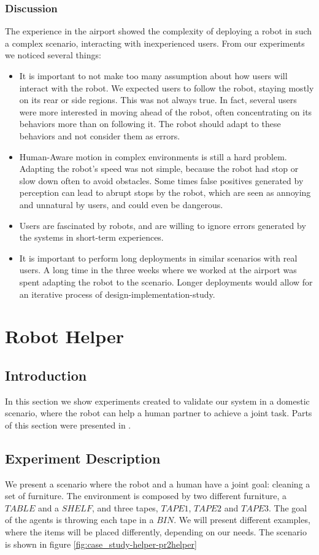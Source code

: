 \subsubsection{Discussion}
The experience in the airport showed the complexity of deploying a robot in such a complex scenario, interacting with inexperienced users. From our experiments we noticed several things:
\begin{itemize}
\item It is important to not make too many assumption about how users will interact with the robot. We expected users to follow the robot, staying mostly on its rear or side regions. This was not always true. In fact, several users were more interested in moving ahead of the robot, often concentrating on its behaviors more than on following it. The robot should adapt to these behaviors and not consider them as errors.
\item Human-Aware motion in complex environments is still a hard problem. Adapting the robot's speed was not simple, because the robot had stop or slow down often to avoid obstacles. Some times false positives generated by perception can lead to abrupt stops by the robot, which are seen as annoying and unnatural by users, and could even be dangerous.
\item Users are fascinated by robots, and are willing to ignore errors generated by the systems in short-term experiences.
\item It is important to perform long deployments in similar scenarios with real users. A long time in the three weeks where we worked at the airport was spent adapting the robot to the scenario. Longer deployments would allow for an iterative process of design-implementation-study.
\end{itemize}


\section{Robot Helper}
\label{sec:case_study-helper}
\subsection{Introduction}
\label{subsec:case_study-helper-intro}
In this section we show experiments created to validate our system in a domestic scenario, where the robot can help a human partner to achieve a joint task. Parts of this section were presented in \cite{fioreiser2014}.

\subsection{Experiment Description}
We present a scenario where the robot and a human have a joint goal: cleaning a set of furniture. 
The environment is composed by two different furniture, a $TABLE$ and a $SHELF$, and three tapes,
 $TAPE1$, $TAPE2$ and $TAPE3$. The goal of the agents is throwing each tape in a $BIN$. We will present different examples, where the items will be placed differently, depending on our needs. The scenario is shown in figure \ref{fig:case_study-helper-pr2helper}

